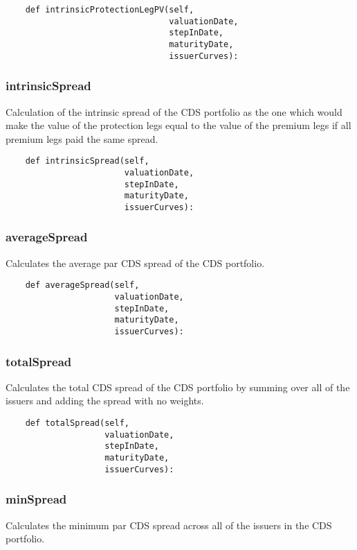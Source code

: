 \documentclass[twoside,11pt]{book}
\begin{document}
\begin{lstlisting}
    def intrinsicProtectionLegPV(self,
                                 valuationDate,
                                 stepInDate,
                                 maturityDate,
                                 issuerCurves):
\end{lstlisting}

\subsubsection*{{\bf intrinsicSpread}}
Calculation of the intrinsic spread of the CDS portfolio as the one which would make the value of the protection legs equal to the value of the premium legs if all premium legs paid the same spread.  

\begin{lstlisting}
    def intrinsicSpread(self,
                        valuationDate,
                        stepInDate,
                        maturityDate,
                        issuerCurves):
\end{lstlisting}

\subsubsection*{{\bf averageSpread}}
Calculates the average par CDS spread of the CDS portfolio.  

\begin{lstlisting}
    def averageSpread(self,
                      valuationDate,
                      stepInDate,
                      maturityDate,
                      issuerCurves):
\end{lstlisting}

\subsubsection*{{\bf totalSpread}}
Calculates the total CDS spread of the CDS portfolio by summing  over all of the issuers and adding the spread with no weights.  

\begin{lstlisting}
    def totalSpread(self,
                    valuationDate,
                    stepInDate,
                    maturityDate,
                    issuerCurves):
\end{lstlisting}

\subsubsection*{{\bf minSpread}}
Calculates the minimum par CDS spread across all of the issuers in the CDS portfolio.  
\end{document}
